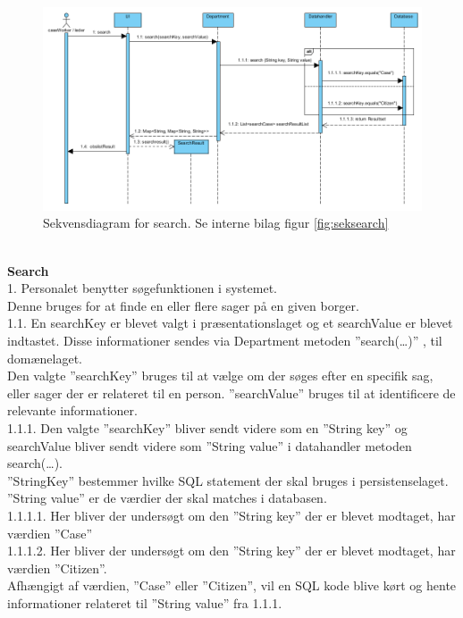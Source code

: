 \begin{figure}[htb!]
  \includegraphics[scale = 0.55]{./PNG/design/seksearch.PNG} 
  \caption{Sekvensdiagram for search. Se interne bilag figur \ref{fig:seksearch}}
  \label{fig:2savecase}
\end{figure}
\\\textbf{Search}\\
1.	Personalet benytter søgefunktionen i systemet.\\
Denne bruges for at finde en eller flere sager på en given borger. \\
1.1.	En searchKey er blevet valgt i præsentationslaget og et searchValue er blevet\\ indtastet. Disse informationer sendes via Department metoden ”search(…)” , til domænelaget. \\
Den valgte ”searchKey” bruges til at vælge om der søges efter en specifik sag, eller sager der er relateret til en person. ”searchValue” bruges til at identificere de relevante informationer.\\
1.1.1.	Den valgte ”searchKey” bliver sendt videre som en ”String key” og searchValue bliver sendt videre som ”String value” i datahandler metoden search(…). \\
”StringKey” bestemmer hvilke SQL statement der skal bruges i persistenselaget. ”String value” er de værdier der skal matches i databasen. \\
1.1.1.1.	Her bliver der undersøgt om den ”String key” der er blevet modtaget, har værdien ”Case”\\
1.1.1.2.	 Her bliver der undersøgt om den ”String key” der er blevet modtaget, har værdien ”Citizen”. \\
Afhængigt af værdien, ”Case” eller ”Citizen”, vil en SQL kode blive kørt og hente informationer relateret til ”String value” fra 1.1.1.\\
